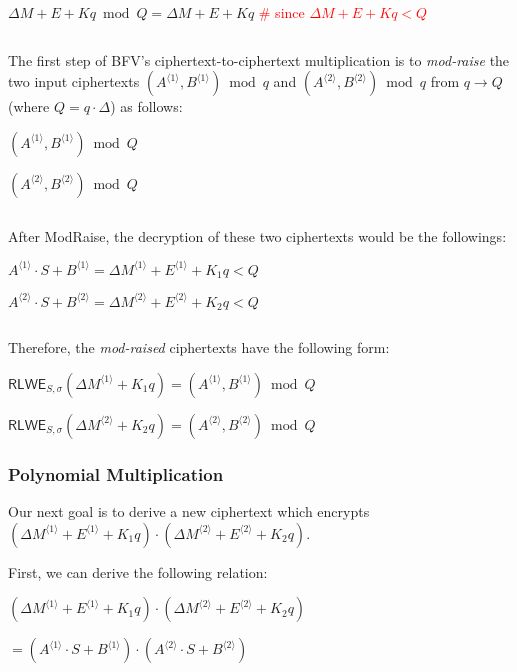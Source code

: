 $\Delta M + E + Kq \bmod Q = \Delta M + E + Kq$ \textcolor{red}{ \#  since $\Delta M + E + Kq < Q$} 

$ $

The first step of BFV's ciphertext-to-ciphertext multiplication is to \textit{mod-raise} the two input ciphertexts $(A^{\langle 1 \rangle}, B^{\langle 1 \rangle}) \bmod q$ and $(A^{\langle 2 \rangle}, B^{\langle 2 \rangle}) \bmod q$  
from $q \rightarrow Q$ (where $Q = q\cdot \Delta$) as follows: 

$(A^{\langle 1 \rangle}, B^{\langle 1 \rangle}) \bmod Q$

$(A^{\langle 2 \rangle}, B^{\langle 2 \rangle}) \bmod Q$

$ $

After \textsf{ModRaise}, the decryption of these two ciphertexts would be the followings: 

$A^{\langle 1 \rangle} \cdot S + B^{\langle 1 \rangle} = \Delta M^{\langle 1 \rangle} + E^{\langle 1 \rangle} + K_1q < Q$

$A^{\langle 2 \rangle} \cdot S + B^{\langle 2 \rangle} = \Delta M^{\langle 2 \rangle} + E^{\langle 2 \rangle} + K_2q < Q$


$ $

Therefore, the \textit{mod-raised} ciphertexts have the following form: 

$\textsf{RLWE}_{S, \sigma}(\Delta M^{\langle 1 \rangle} + K_1q) = (A^{\langle 1 \rangle}, B^{\langle 1 \rangle}) \bmod Q$

$\textsf{RLWE}_{S, \sigma}(\Delta M^{\langle 2 \rangle} + K_2q) = (A^{\langle 2 \rangle}, B^{\langle 2 \rangle}) \bmod Q$


\subsubsection{Polynomial Multiplication}
\label{subsubsec:bfv-mult-cipher-multiplication}

Our next goal is to derive a new ciphertext which encrypts 
$(\Delta M^{\langle 1 \rangle} + E^{\langle 1 \rangle} + K_1q) \cdot (\Delta M^{\langle 2 \rangle} + E^{\langle 2 \rangle} + K_2q)$. 

First, we can derive the following relation: 

$(\Delta M^{\langle 1 \rangle} + E^{\langle 1 \rangle} + K_1q) \cdot (\Delta M^{\langle 2 \rangle} + E^{\langle 2 \rangle} + K_2q)$

$ = (A^{\langle 1 \rangle} \cdot S + B^{\langle 1 \rangle}) \cdot (A^{\langle 2 \rangle} \cdot S + B^{\langle 2 \rangle})$

